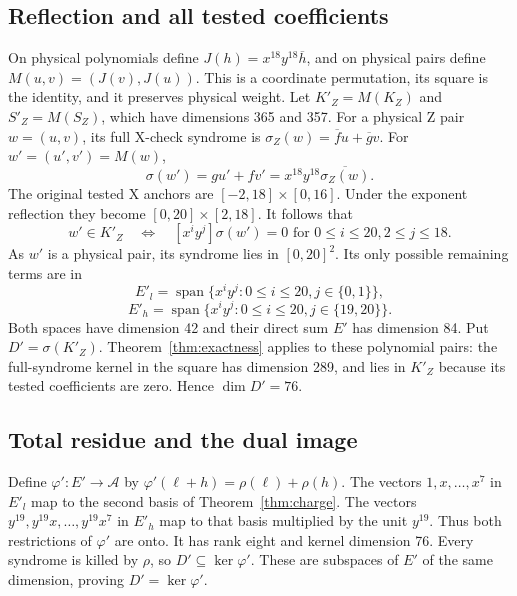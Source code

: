 \documentclass{article}
\DeclareMathOperator{\Span}{span}
\begin{document}
\subsection{Reflection and all tested coefficients}\label{sec:z-reflection}

On physical polynomials define
\(J(h)=x^{18}y^{18}\overline{h}\), and on physical pairs define
\(M(u,v)=(J(v),J(u))\). This is a coordinate permutation, its square is
the identity, and it preserves physical weight.
Let \(K'_Z=M(K_Z)\) and \(S'_Z=M(S_Z)\), which have dimensions 365 and 357.
For a physical Z pair \(w=(u,v)\), its full X-check syndrome is
\(\sigma_Z(w)=\overline{f}u+\overline{g}v\).
For \(w'=(u',v')=M(w)\),
\begin{equation}
  \sigma(w')=gu'+fv'=x^{18}y^{18}\overline{\sigma_Z(w)}.
\end{equation}
The original tested X anchors are \([-2,18]\times[0,16]\).
Under the exponent reflection they become \([0,20]\times[2,18]\).
It follows that
\begin{equation}
  w'\in K'_Z \quad\Longleftrightarrow\quad
  [x^iy^j]\sigma(w')=0
  \text{ for } 0\le i\le 20, 2\le j\le 18.
\end{equation}
As \(w'\) is a physical pair, its syndrome lies in \([0,20]^2\).
Its only possible remaining terms are in
\begin{equation}
  E'_l=\Span\{x^iy^j:0\le i\le 20, j\in\{0,1\}\},
\end{equation}
\begin{equation}
  E'_h=\Span\{x^iy^j:0\le i\le 20, j\in\{19,20\}\}.
\end{equation}
Both spaces have dimension 42 and their direct sum \(E'\) has dimension 84.
Put \(D'=\sigma(K'_Z)\). Theorem~\ref{thm:exactness} applies to these
polynomial pairs: the full-syndrome kernel in the square has dimension 289, and
lies in \(K'_Z\) because its tested coefficients are zero. Hence \(\dim D'=76\).

\subsection{Total residue and the dual image}\label{sec:z-residue}

Define \(\varphi'\colon E'\to\mathcal{A}\) by
\(\varphi'(\ell+h)=\rho(\ell)+\rho(h)\).
The vectors \(1,x,\dots,x^7\) in \(E'_l\) map to the second basis of
Theorem~\ref{thm:charge}. The vectors \(y^{19},y^{19}x,\dots,y^{19}x^7\) in
\(E'_h\) map to that basis multiplied by the unit \(y^{19}\).
Thus both restrictions of \(\varphi'\) are onto. It has rank eight and
kernel dimension 76.
Every syndrome is killed by \(\rho\), so \(D'\subseteq\ker\varphi'\).
These are subspaces of \(E'\) of the same dimension, proving
\(D'=\ker\varphi'\).
\end{document}
